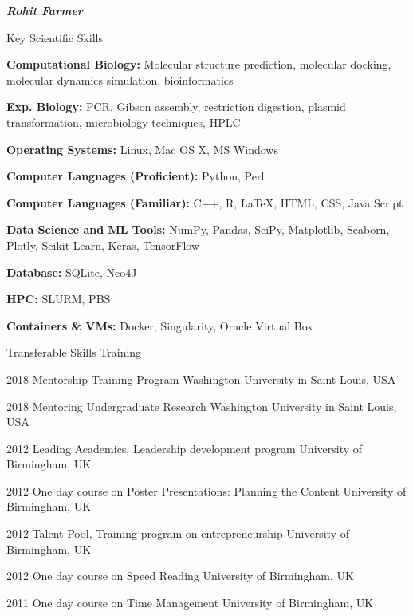\documentclass[10pt]{article}
\begin{document}
\begin{cv}{\huge \it \bfseries Rohit Farmer}
\newpage
\begin{cvlist}{Key Scientific Skills}
	\item[\textbf{Computational Biology:}] Molecular structure prediction,	molecular docking, molecular dynamics simulation, bioinformatics
	\item[\textbf{Exp. Biology:}] PCR, Gibson assembly, restriction digestion, plasmid transformation, microbiology techniques, 
	HPLC
	\item[\textbf{Operating Systems:}] Linux, Mac OS X, MS Windows
	\item[\textbf{Computer Languages (Proficient):}] Python, Perl
	\item[\textbf{Computer Languages (Familiar):}] C++, R, \LaTeX, HTML, CSS, Java Script
	\item[\textbf{Data Science and ML Tools:}] NumPy, Pandas, SciPy, Matplotlib, Seaborn, Plotly, Scikit Learn, Keras, TensorFlow
	\item[\textbf{Database:}] SQLite, Neo4J
	\item[\textbf{HPC:}] SLURM, PBS
	\item[\textbf{Containers \& VMs:}] Docker, Singularity, Oracle Virtual Box
\end{cvlist}

\vskip3pt
\begin{cvlist}{Transferable Skills Training}
	\item[2018] Mentorship Training Program \hfill Washington University in Saint Louis, USA
	\item[2018] Mentoring Undergraduate Research \hfill Washington University in Saint Louis, USA
	\item[2012] Leading Academics, Leadership development program \hfill University of Birmingham, UK
	\item[2012] One day course on Poster Presentations: Planning the Content \hfill University of Birmingham, UK
	\item[2012] Talent Pool, Training program on entrepreneurship \hfill University of Birmingham, UK
	\item[2012] One day course on Speed Reading \hfill University of Birmingham, UK
	\item[2011] One day course on Time Management \hfill University of Birmingham, UK
\end{cvlist}


\end{cv}
\end{document}
